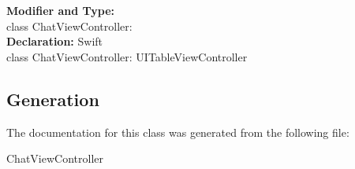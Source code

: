 \textbf{Modifier and Type:}\\
\tab class ChatViewController:\\


\textbf{Declaration:}
\tab 
Swift\\

class ChatViewController: UITableViewController\\





\subsection{Generation}
The documentation for this class was generated from the following file\-:
\begin{DoxyCompactItemize}
\item ChatViewController
\end{DoxyCompactItemize} 









